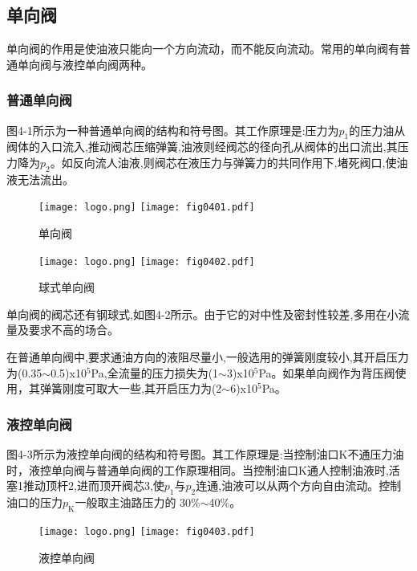 \subsection{单向阀}

单向阀的作用是使油液只能向一个方向流动，而不能反向流动。常用的单向阀有普通单向阀与液控单向阀两种。

\subsubsection{普通单向阀}

图4-1所示为一种普通单向阀的结构和符号图。其工作原理是:压力为$p_\text{1}$的压力油从阀体的入口流入,推动阀芯压缩弹簧,油液则经阀芯的径向孔从阀体的出口流出,其压力降为$p_\text{2}$。如反向流人油液,则阀芯在液压力与弹簧力的共同作用下,堵死阀口,使油液无法流出。

\begin{figure}[htbp]\centering
\ifOpenSource
\texttt{[image: logo.png]}
\else
\texttt{[image: fig0401.pdf]}
\fi
\caption{单向阀}
\label{fig:fig0401}
\end{figure}

\begin{figure}[htbp]\centering
\ifOpenSource
\texttt{[image: logo.png]}
\else
\texttt{[image: fig0402.pdf]}
\fi
\caption{球式单向阀}
\label{fig:fig0402}
\end{figure}

单向阀的阀芯还有钢球式,如图4-2所示。由于它的对中性及密封性较差,多用在小流量及要求不高的场合。

在普通单向阀中,要求通油方向的液阻尽量小,一般选用的弹簧刚度较小,其开启压力为(0.35$\sim$0.5)x10$^5$Pa,全流量的压力损失为(1$\sim$3)x10$^5$Pa。如果单向阀作为背压阀使用，其弹簧刚度可取大一些,其开启压力为(2$\sim$6)x10$^5$Pa。

\subsubsection{液控单向阀}

图4-3所示为液控单向阀的结构和符号图。其工作原理是:当控制油口K不通压力油时，液控单向阀与普通单向阀的工作原理相同。当控制油口K通人控制油液时,活塞1推动顶杆2,进而顶开阀芯3,使$p_\text{1}$与$p_\text{2}$连通,油液可以从两个方向自由流动。控制油口的压力$p_\text{K}$一般取主油路压力的 30\%$\sim$40\%。

\begin{figure}[htbp]\centering
\ifOpenSource
\texttt{[image: logo.png]}
\else
\texttt{[image: fig0403.pdf]}
\fi
\caption{液控单向阀}
\label{fig:fig0403}
\end{figure}

